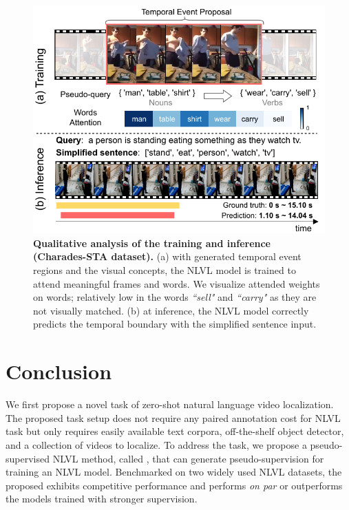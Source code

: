 


\begin{figure}[t]
    \centering
    \vspace{-0.5em}
    \includegraphics[width=0.9\linewidth]{figures/qualitative_result.pdf}
    \caption{\textbf{Qualitative analysis of the training and inference (Charades-STA dataset).} (a) with generated temporal event regions and the visual concepts, the NLVL model is trained to attend meaningful frames and words. We visualize attended weights on words; relatively low in the words \emph{``sell"} and \emph{``carry"} as they are not visually matched. (b) at inference, the NLVL model correctly predicts the temporal boundary with the simplified sentence input.}
    \vspace{-0.8em}
    \label{fig:example}
\end{figure} 


\section{Conclusion}
We first propose a novel task of zero-shot natural language video localization. 
The proposed task setup does not require any paired annotation cost for NLVL task but only requires easily available text corpora, off-the-shelf object detector, and a collection of videos to localize.
To address the task, we propose a pseudo-supervised NLVL method, called \method, that can generate pseudo-supervision for training an NLVL model.
Benchmarked on two widely used NLVL datasets, the proposed \method exhibits competitive performance and performs \emph{on par} or outperforms the models trained with stronger supervision.
